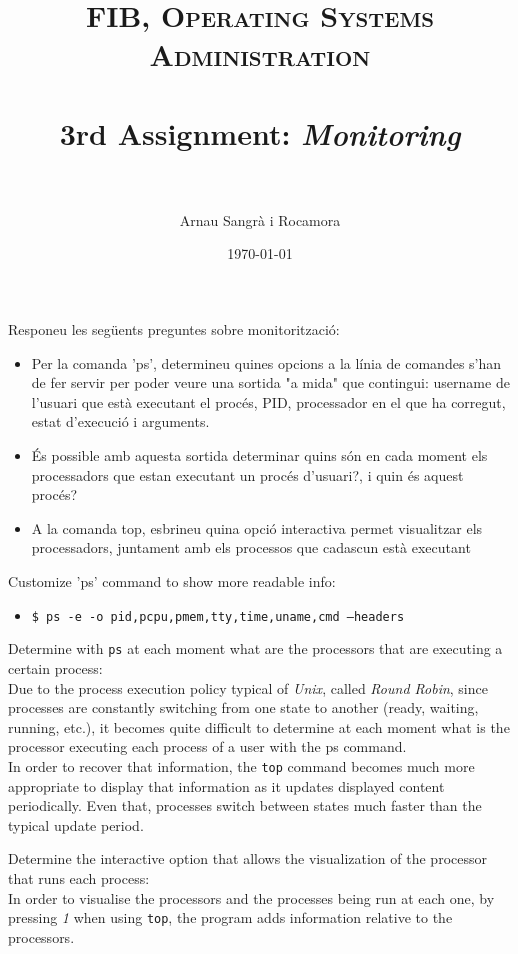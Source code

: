 \documentclass[10pt,a4paper]{article}
\title{
	\normalfont \normalsize 
	\textsc{FIB, Operating Systems Administration} \\ [25pt] %
	\horrule{0.5pt} \\[0.4cm] %
	\huge 3rd Assignment: \textit{Monitoring}\\ %
	\horrule{2pt} \\[0.5cm] %
}
\author{Arnau Sangrà i Rocamora}
\date{\normalsize\today} %
\begin{document}
	\maketitle
	
	Responeu les següents preguntes sobre monitorització:\\
	\begin{itemize}
		\item Per la comanda 'ps', determineu quines opcions a la línia de comandes s'han de fer servir per poder veure una sortida "a mida" que contingui: username de l'usuari que està executant el procés, PID, processador en el que ha corregut, estat d'execució i arguments.
		\item És possible amb aquesta sortida determinar quins són en cada moment els processadors que estan executant un procés d'usuari?, i quin és aquest procés?
		\item A la comanda top, esbrineu quina opció interactiva permet visualitzar els processadors, juntament amb els processos que cadascun està executant
	\end{itemize}
	
	\vspace{1cm}
	
	\color{darkblue}
	Customize 'ps' command to show more readable info:
	\begin{itemize}
		\item \texttt{\$ ps -e -o pid,pcpu,pmem,tty,time,uname,cmd --headers}
	\end{itemize}
	
	\vspace{0.5cm}
	
	Determine with \texttt{ps} at each moment what are the processors that are executing a certain process:\\
	
	Due to the process execution policy typical of \textit{Unix}, called \textit{Round Robin}, since processes are constantly switching from one state to another (ready, waiting, running, etc.), it becomes quite difficult to determine at each moment what is the processor executing each process of a user with the ps command.\\
	In order to recover that information, the \texttt{top} command becomes much more appropriate to display that information as it updates displayed content periodically. Even that, processes switch between states much faster than the typical update period.
	
	\vspace{0.7cm}
	Determine the interactive option that allows the visualization of the processor that runs each process:\\
	
	In order to visualise the processors and the processes being run at each one, by pressing \textit{1} when using \texttt{top}, the program adds information relative to the processors.	
	
\end{document}
